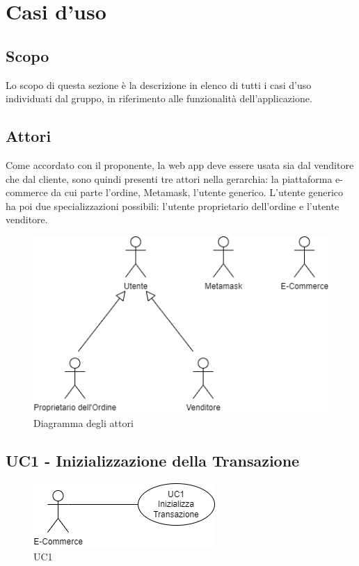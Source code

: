 \section{Casi d'uso} \label{section:casi_uso}

\subsection{Scopo}
Lo scopo di questa sezione è la descrizione in elenco di tutti i casi d'uso individuati dal gruppo, in
riferimento alle funzionalità dell'applicazione.

\subsection{Attori}
Come accordato con il proponente, la web app\glo{} deve essere usata sia dal venditore che dal cliente,
sono quindi presenti tre attori nella gerarchia: la piattaforma e-commerce\glo{} da cui parte l'ordine, Metamask\glo{}, l'utente generico.
L'utente generico ha poi due specializzazioni possibili: l'utente proprietario dell'ordine e l'utente venditore.

\begin{figure}[H]
    \centering
    \includegraphics[scale=0.7]{immagini/UseCases-Attori.png}
    \caption{Diagramma degli attori}
\end{figure}

\subsection{UC1 - Inizializzazione della Transazione}\label{subsection: UC1}

\begin{figure}[H]
    \centering
    \includegraphics[scale=0.7]{immagini/UseCases-UC1.png}
    \caption{UC1}
\end{figure}

